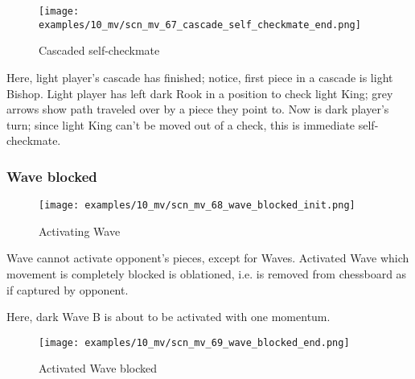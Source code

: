 \vspace*{-2.1\baselineskip}
\noindent
\begin{figure}[h]
\texttt{[image: examples/10\_mv/scn\_mv\_67\_cascade\_self\_checkmate\_end.png]}
\caption{Cascaded self-checkmate}
\label{fig:scn_mv_67_cascade_self_checkmate_end}
\end{figure}

Here, light player's cascade has finished; notice, first piece in a cascade is light
Bishop. Light player has left dark Rook in a position to check light King; grey arrows
show path traveled over by a piece they point to. Now is dark player's turn; since
light King can't be moved out of a check, this is immediate self-checkmate.

\clearpage %

\subsubsection*{Wave blocked}
\label{sec:Miranda's veil/Wave/Cascading opponent/Wave blocked}

\vspace*{-1.4\baselineskip}
\noindent
\begin{figure}[h]
\texttt{[image: examples/10\_mv/scn\_mv\_68\_wave\_blocked\_init.png]}
\caption{Activating Wave}
\label{fig:scn_mv_68_wave_blocked_init}
\end{figure}

Wave cannot activate opponent's pieces, except for Waves. Activated Wave which movement
is completely blocked is oblationed, i.e. is removed from chessboard as if captured by
opponent.

Here, dark Wave B is about to be activated with one momentum.

\clearpage %

\vspace*{-2.1\baselineskip}
\noindent
\begin{figure}[h]
\texttt{[image: examples/10\_mv/scn\_mv\_69\_wave\_blocked\_end.png]}
\caption{Activated Wave blocked}
\label{fig:scn_mv_69_wave_blocked_end}
\end{figure}

